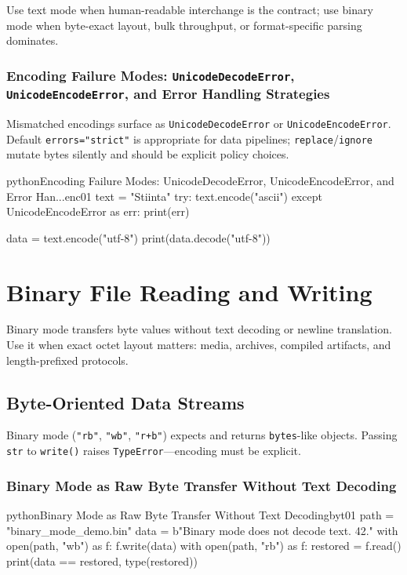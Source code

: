 \documentclass[a4paper,twoside]{report}
\begin{document}
Use text mode when human-readable interchange is the contract; use binary mode when byte-exact layout, bulk throughput, or format-specific parsing dominates.

\subsubsection{Encoding Failure Modes: \texttt{UnicodeDecodeError}, \texttt{UnicodeEncodeError}, and Error Handling Strategies}

Mismatched encodings surface as \texttt{UnicodeDecodeError} or \texttt{UnicodeEncodeError}. Default \texttt{errors="strict"} is appropriate for data pipelines; \texttt{replace}/\texttt{ignore} mutate bytes silently and should be explicit policy choices.

\begin{codebox}[]{python}{Encoding Failure Modes: UnicodeDecodeError, UnicodeEncodeError, and Error Han...}{enc01}
text = "Stiinta"
try:
    text.encode("ascii")
except UnicodeEncodeError as err:
    print(err)

data = text.encode("utf-8")
print(data.decode("utf-8"))
\end{codebox}




\section{Binary File Reading and Writing}

Binary mode transfers byte values without text decoding or newline translation. Use it when exact octet layout matters: media, archives, compiled artifacts, and length-prefixed protocols.


\subsection{Byte-Oriented Data Streams}

Binary mode (\texttt{"rb"}, \texttt{"wb"}, \texttt{"r+b"}) expects and returns \texttt{bytes}-like objects. Passing \texttt{str} to \texttt{write()} raises \texttt{TypeError}---encoding must be explicit.

\subsubsection{Binary Mode as Raw Byte Transfer Without Text Decoding}

\begin{codebox}[]{python}{Binary Mode as Raw Byte Transfer Without Text Decoding}{byt01}
path = "binary_mode_demo.bin"
data = b"Binary mode does not decode text. 42.\n"
with open(path, "wb") as f:
    f.write(data)
with open(path, "rb") as f:
    restored = f.read()
print(data == restored, type(restored))
\end{codebox}
\end{document}
